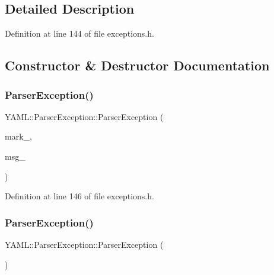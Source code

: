 \subsection{Detailed Description}


Definition at line 144 of file exceptions.\+h.



\subsection{Constructor \& Destructor Documentation}
\mbox{\label{class_y_a_m_l_1_1_parser_exception_a5a1d0825f91f252f08876be881b0847a}} 
\subsubsection{\texorpdfstring{ParserException()}{ParserException()}\hspace{0.1cm}{\footnotesize\ttfamily [1/2]}}
{\footnotesize\ttfamily Y\+A\+M\+L\+::\+Parser\+Exception\+::\+Parser\+Exception (\begin{DoxyParamCaption}\item[{const \mbox{\hyperlink{struct_y_a_m_l_1_1_mark}{Mark}} \&}]{mark\+\_\+,  }\item[{const \mbox{\hyperlink{glad_8h_ac83513893df92266f79a515488701770}{std\+::string}} \&}]{msg\+\_\+ }\end{DoxyParamCaption})\hspace{0.3cm}{\ttfamily [inline]}}



Definition at line 146 of file exceptions.\+h.

\mbox{\label{class_y_a_m_l_1_1_parser_exception_aff21f430941908d29dcf8c4348482574}} 
\subsubsection{\texorpdfstring{ParserException()}{ParserException()}\hspace{0.1cm}{\footnotesize\ttfamily [2/2]}}
{\footnotesize\ttfamily Y\+A\+M\+L\+::\+Parser\+Exception\+::\+Parser\+Exception (\begin{DoxyParamCaption}\item[{const \mbox{\hyperlink{class_y_a_m_l_1_1_parser_exception}{Parser\+Exception}} \&}]{ }\end{DoxyParamCaption})\hspace{0.3cm}{\ttfamily [default]}}

